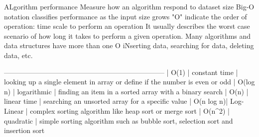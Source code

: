 

ALgorithm performance
    Measure how an algorithm respond to dataset size 
    Big-O notation 
        classifies performance as the input size grows 
        "O" indicate the order of operation: time scale to perform an operation 
        It usually describes the worst case scenario of how long it takes to perform a given operation.
    Many algorithms and data structures have more than one O 
        iNserting data, searching for data, deleting data, etc.


    ---------------------------------------------------------------------
    | O(1)      | constant time | looking up a single element in array  or define if the number is even or odd
    | O(log n)  | logarithmic   | finding an item in a sorted array with a binary search 
    | O(n)      | linear time   | searching an unsorted array for a  specific value 
    | O(n log n)| Log-Linear    | complex sorting algorithm like heap sort or merge sort 
    | O(n^2)    | quadratic     | simple sorting algorithm such as bubble sort, selection sort and insertion sort
